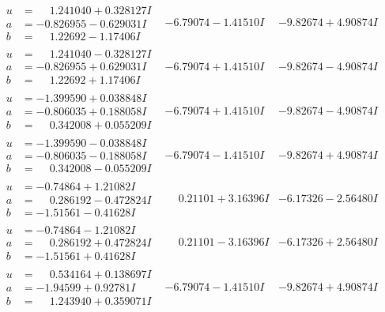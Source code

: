 \documentclass[1p]{elsarticle_modified}
\theoremstyle{definition}
\begin{document}
$$\begin{array}{c|c|c}
\begin{aligned}
u &= \phantom{-}1.241040 + 0.328127 I \\
a &= -0.826955 - 0.629031 I \\
b &= \phantom{-}1.22692 - 1.17406 I\end{aligned}
 & -6.79074 - 1.41510 I & -9.82674 + 4.90874 I \\ \hline\begin{aligned}
u &= \phantom{-}1.241040 - 0.328127 I \\
a &= -0.826955 + 0.629031 I \\
b &= \phantom{-}1.22692 + 1.17406 I\end{aligned}
 & -6.79074 + 1.41510 I & -9.82674 - 4.90874 I \\ \hline\begin{aligned}
u &= -1.399590 + 0.038848 I \\
a &= -0.806035 + 0.188058 I \\
b &= \phantom{-}0.342008 + 0.055209 I\end{aligned}
 & -6.79074 + 1.41510 I & -9.82674 - 4.90874 I \\ \hline\begin{aligned}
u &= -1.399590 - 0.038848 I \\
a &= -0.806035 - 0.188058 I \\
b &= \phantom{-}0.342008 - 0.055209 I\end{aligned}
 & -6.79074 - 1.41510 I & -9.82674 + 4.90874 I \\ \hline\begin{aligned}
u &= -0.74864 + 1.21082 I \\
a &= \phantom{-}0.286192 - 0.472824 I \\
b &= -1.51561 - 0.41628 I\end{aligned}
 & \phantom{-}0.21101 + 3.16396 I & -6.17326 - 2.56480 I \\ \hline\begin{aligned}
u &= -0.74864 - 1.21082 I \\
a &= \phantom{-}0.286192 + 0.472824 I \\
b &= -1.51561 + 0.41628 I\end{aligned}
 & \phantom{-}0.21101 - 3.16396 I & -6.17326 + 2.56480 I \\ \hline\begin{aligned}
u &= \phantom{-}0.534164 + 0.138697 I \\
a &= -1.94599 + 0.92781 I \\
b &= \phantom{-}1.243940 + 0.359071 I\end{aligned}
 & -6.79074 - 1.41510 I & -9.82674 + 4.90874 I \\ \hline\begin{aligned}

\end{aligned}
\end{array}$$
\end{document}
